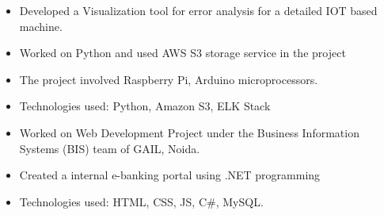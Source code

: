 \documentclass[10pt,a4paper]{altacv}
\begin{document}

\begin{fullwidth}
\makecvheader
\end{fullwidth}


\begin{itemize}
\item Developed a Visualization tool for error analysis for a detailed IOT based machine.
\item Worked on Python and used AWS S3 storage service in the project
\item The project involved Raspberry Pi, Arduino microprocessors.
\item Technologies used: Python, Amazon S3, ELK Stack
\end{itemize}

\divider

\begin{itemize}
\item Worked on Web Development Project under the Business Information Systems (BIS) team of GAIL, Noida.
\item Created a internal e-banking portal using .NET programming
\item Technologies used: HTML, CSS, JS, C\#, MySQL.
\end{itemize}

\medskip

\end{document}
